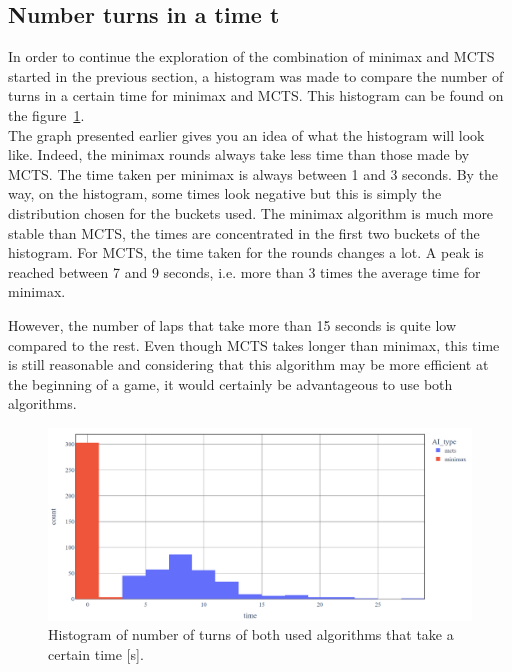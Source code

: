 \subsection{Number turns in a time t}
In order to continue the exploration of the combination of minimax and MCTS started in the previous section,
a histogram was made to compare the number of turns in a certain time for minimax and MCTS. This histogram can
be found on the figure~\ref{fig:histo}.\\

The graph presented earlier gives you an idea of what the histogram will look like. Indeed, the minimax rounds always take less time than those made by MCTS.
The time taken per minimax is always between 1 and 3 seconds. By the way, on the histogram, some times look negative but this is simply the distribution chosen for the buckets used.
The minimax algorithm is much more stable than MCTS, the times are concentrated in the first two buckets of the histogram. For MCTS, the time taken for the rounds changes a lot.
A peak is reached between 7 and 9 seconds, i.e. more than 3 times the average time for minimax.

However, the number of laps that take more than 15 seconds is quite low compared to the rest. Even though MCTS takes longer than minimax,
this time is still reasonable and considering that this algorithm may be more efficient at the beginning of a game, it would certainly be advantageous to use both algorithms.

\begin{figure}[ht]
    \centering
    \includegraphics[width=\linewidth]{nb_turn_in_time_t.png}
    \caption{Histogram of number of turns of both used algorithms that take a certain time [s].}
    \label{fig:histo}
\end{figure}